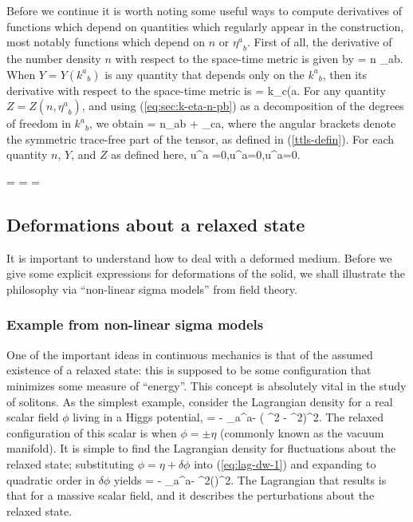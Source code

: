  
Before we continue it is worth noting some useful ways to compute derivatives of functions which depend on quantities which regularly appear in the construction, most notably functions which depend on $n$ or ${\eta^a}_b$.
First of all, the derivative of the number density $n$ with respect to the space-time metric is given by
\bea
\label{eq:sec:dndg}
 = \half n \gamma_{ab}.
\eea
When $Y = Y({k^a}_b)$ is any quantity that depends only on the ${k^a}_b$,  then its derivative with respect to the space-time metric is
\bea
\label{eq:pd-Y-g-k}
 = k_{c(a}.
\eea
For any quantity $Z = Z(n,{\eta^a}_b)$, and using (\ref{eq:sec:k-eta-n-pb}) as a decomposition of the degrees of freedom in ${k^a}_b$, we obtain
\bea
\label{eq:sec:Zneta}
 = \half n\gamma_{ab} + \eta_{c\langle a},
\eea
where the angular brackets denote the symmetric trace-free part of the tensor, as defined in (\ref{ttls-defin}). For each quantity $n$, $Y$, and $Z$ as defined here,
\bea
u^a =0,\qquad u^a=0,\qquad u^a=0.
\eea
 
\bse
\bea
{} = 
\eea
\bea
{} = 
\eea
\bea
{} = 
\eea
\ese
\subsection{Deformations about a relaxed state}
It is   important to understand how to deal with a deformed medium. Before we give some explicit expressions for  deformations of the solid, we shall illustrate the philosophy via ``non-linear sigma models'' from field theory.
\subsubsection{Example from non-linear sigma models}
One of the important ideas in continuous mechanics is that of the assumed existence of a relaxed state: this is supposed to be some configuration that minimizes some measure of ``energy''. This concept is absolutely vital in the study of solitons. As the simplest example, consider the Lagrangian density for a real scalar field $\phi$ living in a Higgs potential,
\bea
\label{eq:lag-dw-1}
\ld = - \half \partial_{a}\phi\partial^{a}\phi - \left( \phi^2 - \eta^2\right)^2.
\eea
The relaxed configuration of this scalar is when $\phi = \pm \eta$ (commonly known as the vacuum manifold). It is simple to find the Lagrangian density for fluctuations about the relaxed state; substituting $\phi = \eta + \delta\phi$ into (\ref{eq:lag-dw-1}) and expanding to quadratic order in $\delta\phi$ yields
\bea
\ld = - \half \partial_{a}\delta\phi\partial^{a}\delta\phi - \half \lambda \eta^2(\delta\phi)^2.
\eea
The Lagrangian that results is that for a massive scalar field, and it describes the perturbations about the relaxed state. 

